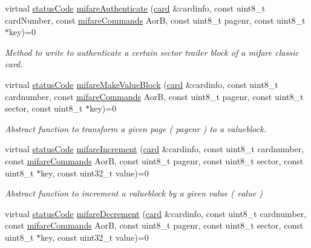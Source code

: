 \begin{DoxyCompactItemize}
virtual \hyperlink{declarations_8h_ae1d20c5a38cae82ccaa6a77be3fd264b}{status\+Code} \hyperlink{classnfc_1_1NFC_a1a6dc3144b89ea1df4ac47b1d2e476d2}{mifare\+Authenticate} (\hyperlink{classcard}{card} \&cardinfo, const uint8\+\_\+t card\+Number, const \hyperlink{declarations_8h_a305b1a3bcfca65e2a82f0f9d24676835}{mifare\+Commands} AorB, const uint8\+\_\+t pagenr, const uint8\+\_\+t $\ast$key)=0
\begin{DoxyCompactList}\small\item\em Method to write to authenticate a certain sector trailer block of a mifare classic card. \end{DoxyCompactList}\item 
virtual \hyperlink{declarations_8h_ae1d20c5a38cae82ccaa6a77be3fd264b}{status\+Code} \hyperlink{classnfc_1_1NFC_a4904606f6d5d94c5c1fde57310af5691}{mifare\+Make\+Value\+Block} (\hyperlink{classcard}{card} \&cardinfo, const uint8\+\_\+t cardnumber, const \hyperlink{declarations_8h_a305b1a3bcfca65e2a82f0f9d24676835}{mifare\+Commands} AorB, const uint8\+\_\+t pagenr, const uint8\+\_\+t sector, const uint8\+\_\+t $\ast$key)=0
\begin{DoxyCompactList}\small\item\em Abstract function to transform a given page ( pagenr ) to a valueblock. \end{DoxyCompactList}\item 
virtual \hyperlink{declarations_8h_ae1d20c5a38cae82ccaa6a77be3fd264b}{status\+Code} \hyperlink{classnfc_1_1NFC_a2c14cb2a6f71cffcc949c084a0cefd2b}{mifare\+Increment} (\hyperlink{classcard}{card} \&cardinfo, const uint8\+\_\+t cardnumber, const \hyperlink{declarations_8h_a305b1a3bcfca65e2a82f0f9d24676835}{mifare\+Commands} AorB, const uint8\+\_\+t pagenr, const uint8\+\_\+t sector, const uint8\+\_\+t $\ast$key, const uint32\+\_\+t value)=0
\begin{DoxyCompactList}\small\item\em Abstract function to increment a valueblock by a given value ( value ) \end{DoxyCompactList}\item 
virtual \hyperlink{declarations_8h_ae1d20c5a38cae82ccaa6a77be3fd264b}{status\+Code} \hyperlink{classnfc_1_1NFC_a81f93853766cc9df5f061b95b6a41700}{mifare\+Decrement} (\hyperlink{classcard}{card} \&cardinfo, const uint8\+\_\+t cardnumber, const \hyperlink{declarations_8h_a305b1a3bcfca65e2a82f0f9d24676835}{mifare\+Commands} AorB, const uint8\+\_\+t pagenr, const uint8\+\_\+t sector, const uint8\+\_\+t $\ast$key, const uint32\+\_\+t value)=0

\end{DoxyCompactItemize}
